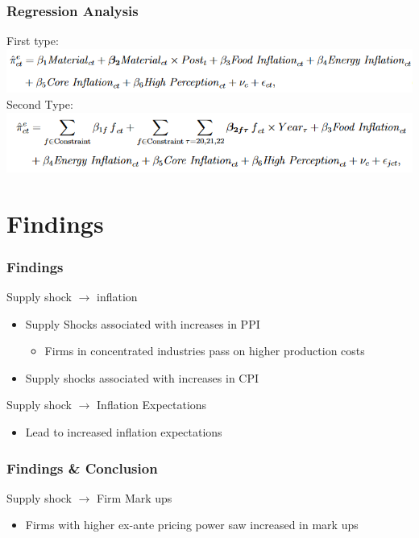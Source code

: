 \documentclass{beamer}
\newcommand{\bb}{\bigbreak\noindent}
\begin{document}
\begin{spacing}{1.5}
\begin{frame}
\end{frame}

\begin{frame}
	\frametitle{Regression Analysis}
	First type:\\
	\includegraphics[width=\textwidth]{postreg}
	\bb
	Second Type:\\
	\includegraphics[width=\textwidth]{yearreg}
	
\end{frame}


\section{Findings}
\begin{frame}
	\frametitle{Findings}
	
	Supply shock $\rightarrow$ inflation
	\begin{itemize}
		\item Supply Shocks associated with increases in PPI
			\begin{itemize}
				\item Firms in concentrated industries pass on higher production costs
			\end{itemize}
		\item Supply shocks associated with increases in CPI
	\end{itemize}
	\bb
	Supply shock $\rightarrow$ Inflation Expectations
	\begin{itemize}
		\item Lead to increased inflation expectations
	\end{itemize}
		
\end{frame}

\begin{frame}
	\frametitle{Findings \& Conclusion}
	
	Supply shock $\rightarrow$ Firm Mark ups
	\begin{itemize}
		\item Firms with higher ex-ante pricing power saw increased in mark ups
	\end{itemize}
	

\end{frame}
\end{spacing}
\end{document}
